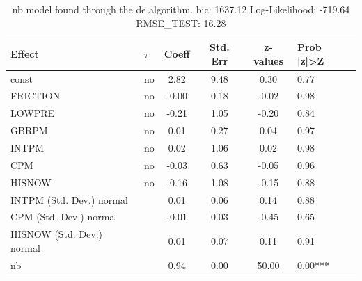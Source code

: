 \begin{table}
	\caption{nb model found through the de algorithm. bic: 1637.12 Log-Likelihood: -719.64 RMSE_TEST: 16.28}
	\begin{center}
		\begin{tabular}{|l|l|c|c|c|l|}
			\hline
			Effect & $\tau$ & Coeff & Std. Err & z-values & Prob |z|>Z \\
			\hline
			const & no & 2.82 & 9.48 & 0.30 & 0.77 \\
			\hline
			FRICTION & no & -0.00 & 0.18 & -0.02 & 0.98 \\
			\hline
			LOWPRE & no & -0.21 & 1.05 & -0.20 & 0.84 \\
			\hline
			GBRPM & no & 0.01 & 0.27 & 0.04 & 0.97 \\
			\hline
			INTPM & no & 0.02 & 1.06 & 0.02 & 0.98 \\
			\hline
			CPM & no & -0.03 & 0.63 & -0.05 & 0.96 \\
			\hline
			HISNOW & no & -0.16 & 1.08 & -0.15 & 0.88 \\
			\hline
			INTPM (Std. Dev.) normal &  & 0.01 & 0.06 & 0.14 & 0.88 \\
			\hline
			CPM (Std. Dev.) normal &  & -0.01 & 0.03 & -0.45 & 0.65 \\
			\hline
			HISNOW (Std. Dev.) normal &  & 0.01 & 0.07 & 0.11 & 0.91 \\
			\hline
			nb &  & 0.94 & 0.00 & 50.00 & 0.00*** \\
			\hline
		\end{tabular}
	\end{center}
\end{table}